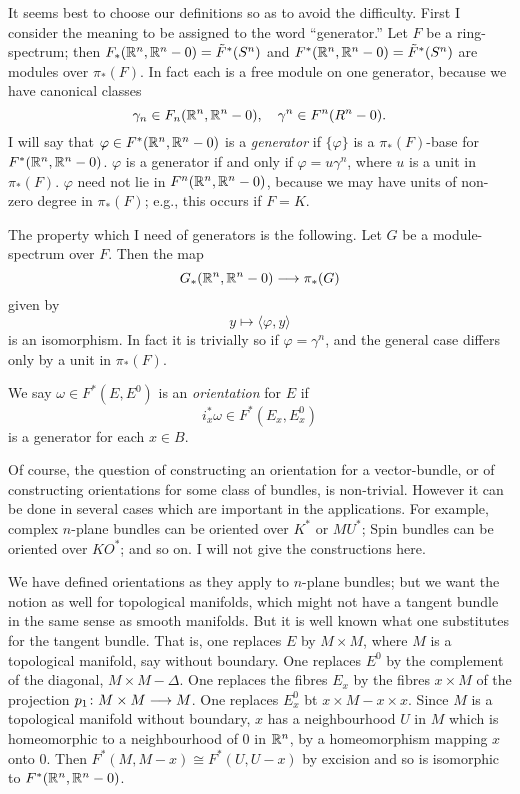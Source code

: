 \documentclass[../main]{subfiles}
\begin{document}
It seems best to choose our definitions so as to avoid the difficulty. First I consider the meaning to be assigned to the word ``generator.'' Let $F$ be a ring-spectrum; then $F_*(\mathbb{R}^n,\mathbb{R}^n-0) = \tilde{F}^*(S^n)$ and $F^*(\mathbb{R}^n,\mathbb{R}^n-0) = \tilde{F}^*(S^n)$ are modules over $\pi_*(F)$. In fact each is a free module on one generator, because we have canonical classes
\[\gamma_n \in F_n(\mathbb{R}^n,\mathbb{R}^n-0), \quad \gamma^n \in F^n(R^n-0).\]
I will say that $\varphi \in F^*(\mathbb{R}^n,\mathbb{R}^n-0)$ is a \emph{generator} if $\{\varphi\}$ is a $\pi_*(F)$-base for $F^*(\mathbb{R}^n,\mathbb{R}^n-0)$. $\varphi$ is a generator if and only if $\varphi = u \gamma^n$, where $u$ is a unit in $\pi_*(F)$. $\varphi$ need not lie in $F^n(\mathbb{R}^n,\mathbb{R}^n-0)$, because we may have units of non-zero degree in $\pi_*(F)$; e.g., this occurs if $F=K$.

The property which I need of generators is the following. Let $G$ be a module-spectrum over $F$. Then the map \[G_*(\mathbb{R}^n,\mathbb{R}^n-0) \longrightarrow \pi_*(G)\]
given by 
\[y \mapsto  \langle \varphi , y \rangle\]
is an isomorphism. In fact it is trivially so if $\varphi = \gamma^n$, and the general case differs only by a unit in $\pi_*(F)$.

We say $\omega \in  F^*(E,E^0)$ is an \emph{orientation} for $E$ if
\[i_x^* \omega \in F^*(E_x,E_x^0)\]
is a generator for each $x \in B$.

Of course, the question of constructing an orientation for a vector-bundle, or of constructing orientations for some class of bundles, is non-trivial. However it can be done in several cases which are important in the applications. For example, complex $n$-plane bundles can be oriented over $K^*$ or $MU^*$; Spin bundles can be oriented over $KO^*$; and so on. I will not give the constructions here.

We have defined orientations as they apply to $n$-plane bundles; but we want the notion as well for topological manifolds, which might not have a tangent bundle in the same sense as smooth manifolds. But it is well known what one substitutes for the tangent bundle. That is, one replaces $E$ by $M \times M$, where $M$ is a topological manifold, say without boundary. One replaces $E^0$ by the complement of the diagonal, $M \times M - \Delta$. One replaces the fibres $E_x$ by the fibres $x \times M$ of the projection $p_1 \colon M \times M \longrightarrow M$. One replaces $E^0_x$ bt $x \times M - x \times x$. Since $M$ is a topological manifold without boundary, $x$ has a neighbourhood $U$ in $M$ which is homeomorphic to a neighbourhood of 0 in $\mathbb{R}^n$, by a homeomorphism mapping $x$ onto 0. Then $F^*(M,M-x) \cong F^*(U,U-x)$ by excision and so is isomorphic to $F^*(\mathbb{R}^n,\mathbb{R}^n - 0)$.
\end{document}
